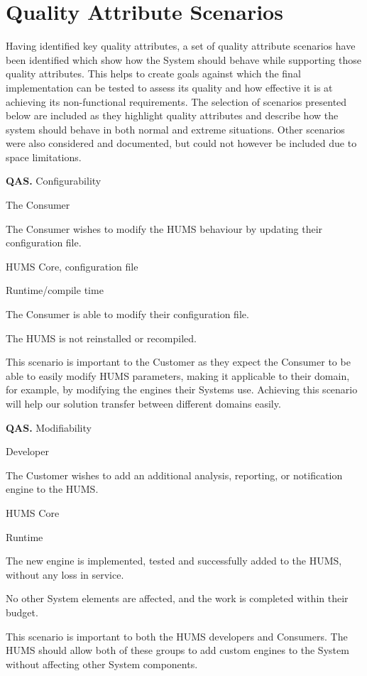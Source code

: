 \documentclass[10pt,a4paper]{article}
\newcommand{\qas}[1]{\textcolor{reqColor}{\textbf{QAS.#1}}}
\newenvironment{scenario}[1]{
\newcommand{\source}[1]{\item[Source of Stimulus:] ##1}
\newcommand{\stimulus}[1]{\item[Stimulus:] ##1}
\newcommand{\artifact}[1]{\item[Artifact:] ##1}
\newcommand{\environment}[1]{\item[Environment:] ##1}
\newcommand{\response}[1]{\item[Response:] ##1}
\newcommand{\measure}[1]{\item[Response Measure:] ##1}
\newcommand{\rationale}[1]{\item[Scenario Rationale:] ##1}
\newcommand{\quality}[1]{\item[Quality:] ##1}
		\begin{description} [noitemsep]	
		\item[Scenario ID:] \qas{#1}
		}{\end{description} \vspace*{0.3cm}
		}
\begin{document}
\section{Quality Attribute Scenarios}
\label{sec:scenarios}
Having identified key quality attributes, a set of quality attribute scenarios have been identified which show how the System should behave while supporting those quality attributes. This helps to create goals against which the final implementation can be tested to assess its quality and how effective it is at achieving its non-functional requirements. The selection of scenarios presented below are included as they highlight quality attributes and describe how the system should behave in both normal and extreme situations. Other scenarios were also considered and documented, but could not however be included due to space limitations.

\begin{scenario}{1}
\quality{Configurability}
\source{The Consumer}
\stimulus{The Consumer wishes to modify the HUMS behaviour by updating their configuration file.}
\artifact{HUMS Core, configuration file}
\environment{Runtime/compile time}
\response{The Consumer is able to modify their configuration file.}
\measure{The HUMS is not reinstalled or recompiled.}
\rationale{This scenario is important to the Customer as they expect the Consumer to be able to easily modify HUMS parameters, making it applicable to their domain, for example, by modifying the engines their Systems use. Achieving this scenario will help our solution transfer between different domains easily.}
\end{scenario}

\begin{scenario}{2}
\quality{Modifiability}
\source{Developer}
\stimulus{The Customer wishes to add an additional analysis, reporting, or notification engine to the HUMS.}
\artifact{HUMS Core}
\environment{Runtime}
\response{The new engine is implemented, tested and successfully added to the HUMS, without any loss in service.}
\measure{No other System elements are affected, and the work is completed within their budget.}
\rationale{This scenario is important to both the HUMS developers and Consumers. The HUMS should allow both of these groups to add custom engines to the System without affecting other System components.}
\end{scenario}
\end{document}
